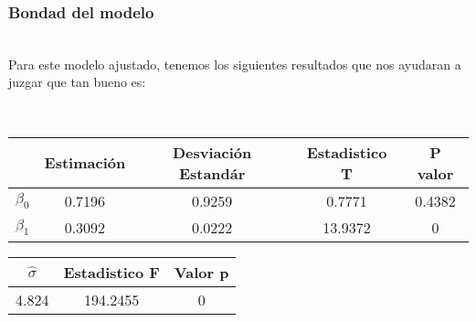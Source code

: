\documentclass[12pt]{beamer}
\begin{document}
\begin{frame}
\frametitle{Bondad del modelo}
~\\Para este modelo ajustado, tenemos los siguientes resultados que nos ayudaran a juzgar que tan bueno es:
\begin{center}
~\\\begin{tabular}{|c|c|c|c|c|}
\hline 
 & Estimación & Desviación Estandár & Estadistico T & P valor \\ 
\hline 
$\beta_{0}$ & 0.7196 & 0.9259 & 0.7771 & 0.4382 \\ 
\hline 
$\beta_{1}$ & 0.3092 & 0.0222 & 13.9372 & 0 \\ 
\hline 
\end{tabular} 
\end{center}
\begin{center}
\begin{tabular}{|c|c|c|}
\hline 
 $\hat{\sigma}$ & Estadistico F & Valor p \\ 
\hline 
 4.824 & 194.2455 & 0 \\ 
\hline 
\end{tabular} 
\end{center}
\end{frame}
\end{document}
